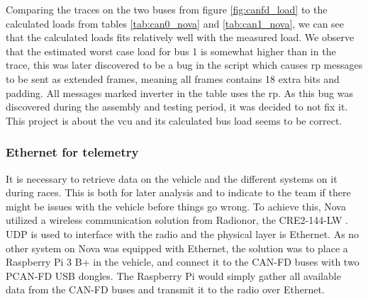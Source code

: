 Comparing the traces on the two buses from figure \ref{fig:canfd_load} to the calculated loads from tables \ref{tab:can0_nova} and \ref{tab:can1_nova}, we can see that the calculated loads fits relatively well with the measured load. We observe that the estimated worst case load for bus 1 is somewhat higher than in the trace, this was later discovered to be a bug in the script which causes \acrlong{rp} messages to be sent as extended frames, meaning all frames contains 18 extra bits and padding. All messages marked inverter in the table uses the \acrlong{rp}. As this bug was discovered during the assembly and testing period, it was decided to not fix it. This project is about the \acrshort{vcu} and its calculated bus load seems to be correct.








\subsubsection{Ethernet for telemetry}

It is necessary to retrieve data on the vehicle and the different systems on it during races. This is both for later analysis and to indicate to the team if there might be issues with the vehicle before things go wrong. To achieve this, Nova utilized a wireless communication solution from Radionor, the CRE2-144-LW \cite{radionor}. UDP is used to interface with the radio and the physical layer is Ethernet. As no other system on Nova was equipped with Ethernet, the solution was to place a Raspberry Pi 3 B+ in the vehicle, and connect it to the CAN-FD buses with two PCAN-FD USB dongles. The Raspberry Pi would simply gather all available data from the CAN-FD buses and transmit it to the radio over Ethernet. 

